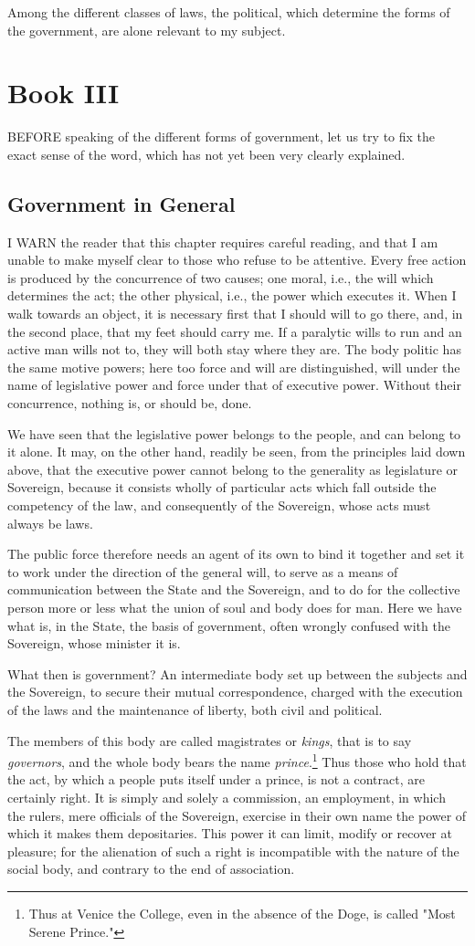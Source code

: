 \documentclass[12pt]{report}
\newcommand{\mychapter}[2]{
\setcounter{chapter}{#1}
    \setcounter{section}{0}
    \chapter*{#2}
    \addcontentsline{toc}{chapter}{#2}
}
\begin{document}
Among the different classes of laws, the political, which determine the forms of the government, are alone relevant to my subject.



\mychapter{3}{Book III}
BEFORE speaking of the different forms of government, let us try to fix the exact sense of the word, which has not yet been very clearly explained.
\section{Government in General}
I WARN the reader that this chapter requires careful reading, and that I am unable to make myself clear to those who refuse to be attentive. Every free action is produced by the concurrence of two causes; one moral, i.e., the will which determines the act; the other physical, i.e., the power which executes it. When I walk towards an object, it is necessary first that I should will to go there, and, in the second place, that my feet should carry me. If a paralytic wills to run and an active man wills not to, they will both stay where they are. The body politic has the same motive powers; here too force and will are distinguished, will under the name of legislative power and force under that of executive power. Without their concurrence, nothing is, or should be, done.

We have seen that the legislative power belongs to the people, and can belong to it alone. It may, on the other hand, readily be seen, from the principles laid down above, that the executive power cannot belong to the generality as legislature or Sovereign, because it consists wholly of particular acts which fall outside the competency of the law, and consequently of the Sovereign, whose acts must always be laws.

The public force therefore needs an agent of its own to bind it together and set it to work under the direction of the general will, to serve as a means of communication between the State and the Sovereign, and to do for the collective person more or less what the union of soul and body does for man. Here we have what is, in the State, the basis of government, often wrongly confused with the Sovereign, whose minister it is.

What then is government? An intermediate body set up between the subjects and the Sovereign, to secure their mutual correspondence, charged with the execution of the laws and the maintenance of liberty, both civil and political.

The members of this body are called magistrates or \textit{kings}, that is to say \textit{governors}, and the whole body bears the name \textit{prince}.\footnote{Thus at Venice the College, even in the absence of the Doge, is called "Most Serene Prince."} Thus those who hold that the act, by which a people puts itself under a prince, is not a contract, are certainly right. It is simply and solely a commission, an employment, in which the rulers, mere officials of the Sovereign, exercise in their own name the power of which it makes them depositaries. This power it can limit, modify or recover at pleasure; for the alienation of such a right is incompatible with the nature of the social body, and contrary to the end of association.
\end{document}
